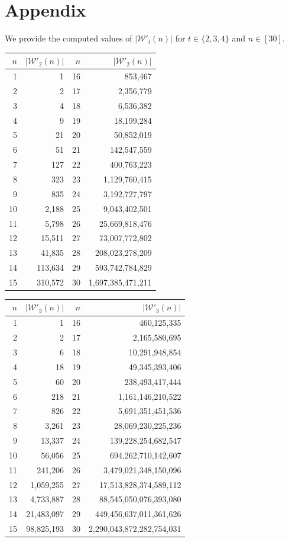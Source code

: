 \documentclass[12pt]{amsart}
\theoremstyle{definition}
\begin{document}
\section{Appendix} \label{app}
We provide the computed values of $|\mathcal{W}'_t(n)|$ for $t\in\{2,3,4\}$ and $n\in[30]$.
\begin{longtable}{rr|rr}
\toprule
$n$ & $|\mathcal{W}'_2(n)|$ & $n$ & $|\mathcal{W}'_2(n)|$ \\ \midrule
1 & 1 & 16 & 853,467 \\
2 & 2 & 17 & 2,356,779 \\
3 & 4 & 18 & 6,536,382 \\
4 & 9 & 19 & 18,199,284 \\
5 & 21 & 20 & 50,852,019 \\
6 & 51 & 21 & 142,547,559 \\
7 & 127 & 22 & 400,763,223 \\
8 & 323 & 23 & 1,129,760,415 \\
9 & 835 & 24 & 3,192,727,797 \\
10 & 2,188 & 25 & 9,043,402,501 \\
11 & 5,798 & 26 & 25,669,818,476 \\
12 & 15,511 & 27 & 73,007,772,802 \\
13 & 41,835 & 28 & 208,023,278,209 \\
14 & 113,634 & 29 & 593,742,784,829 \\
15 & 310,572 & 30 & 1,697,385,471,211 \\ \bottomrule
\end{longtable}
\begin{longtable}{rr|rr}
\toprule
$n$ & $|\mathcal{W}'_3(n)|$ & $n$ & $|\mathcal{W}'_3(n)|$ \\ \midrule
1 & 1 & 16 & 460,125,335 \\
2 & 2 & 17 & 2,165,580,695 \\
3 & 6 & 18 & 10,291,948,854 \\
4 & 18 & 19 & 49,345,393,406 \\
5 & 60 & 20 & 238,493,417,444 \\
6 & 218 & 21 & 1,161,146,210,522 \\
7 & 826 & 22 & 5,691,351,451,536 \\
8 & 3,261 & 23 & 28,069,230,225,236 \\
9 & 13,337 & 24 & 139,228,254,682,547 \\
10 & 56,056 & 25 & 694,262,710,142,607 \\
11 & 241,206 & 26 & 3,479,021,348,150,096 \\
12 & 1,059,255 & 27 & 17,513,828,374,589,112 \\
13 & 4,733,887 & 28 & 88,545,050,076,393,080 \\
14 & 21,483,097 & 29 & 449,456,637,011,361,626 \\
15 & 98,825,193 & 30 & 2,290,043,872,282,754,031 \\ \bottomrule
\end{longtable}
\end{document}
